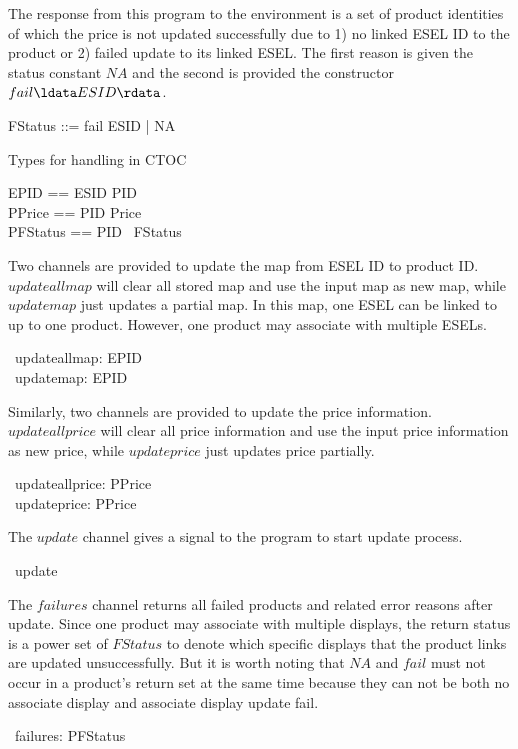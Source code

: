 The response from this program to the environment is a set of product identities of which the price is not updated successfully due to 1) no linked ESEL ID to the product or 2) failed update to its linked ESEL. The first reason is given the status constant $NA$ and the second is provided the constructor $fail\ldata ESID \rdata$.
\begin{zed}
    FStatus ::= fail \ldata ESID \rdata | NA
\end{zed}
Types for handling in CTOC
\begin{zed}
EPID == ESID \pfun PID\\
PPrice == PID \pfun Price\\
PFStatus == PID \pfun \power~FStatus
\end{zed}
Two channels are provided to update the map from ESEL ID to product ID. $updateallmap$ will clear all stored map and use the input map as new map, while $updatemap$ just updates a partial map. In this map, one ESEL can be linked to up to one product. However, one product may associate with multiple ESELs.
\begin{circus}
	\circchannel\ updateallmap: EPID \\
	\circchannel\ updatemap: EPID
\end{circus}

Similarly, two channels are provided to update the price information. $updateallprice$ will clear all price information and use the input price information as new price, while $updateprice$ just updates price partially.
\begin{circus}
	\circchannel\ updateallprice: PPrice \\
	\circchannel\ updateprice: PPrice
\end{circus}

The $update$ channel gives a signal to the program to start update process.
\begin{circus}
	\circchannel\ update
\end{circus}

The $failures$ channel returns all failed products and related error reasons after update. Since one product may associate with multiple displays, the return status is a power set of $FStatus$ to denote which specific displays that the product links are updated unsuccessfully. But it is worth noting that $NA$ and $fail$ must not occur in a product's return set at the same time because they can not be both no associate display and associate display update fail.
\begin{circus}
	\circchannel\ failures: PFStatus
\end{circus}

